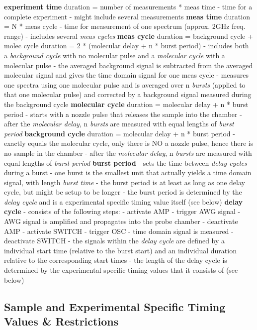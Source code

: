 \textbf{experiment time} duration = number of measurements * meas time -
time for a complete experiment - might include several measurements
\textbf{meas time} duration = N * meas cycle - time for measurement of
one spectrum (approx. 2GHz freq. range) - includes several \emph{meas
cycles} \textbf{meas cycle} duration = background cycle + molec cycle
duration = 2 * (molecular delay + n * burst period) - includes both a
\emph{background cycle} with no molecular pulse and a \emph{molecular
cycle} with a molecular pulse - the averaged background signal is
subtracted from the averaged molecular signal and gives the time domain
signal for one meas cycle - measures one spectra using one molecular
pulse and is averaged over n \emph{bursts} (applied to that one
molecular pulse) and corrected by a background signal measured during
the background cycle \textbf{molecular cycle} duration = molecular delay
+ n * burst period - starts with a nozzle pulse that releases the sample
into the chamber - after the \emph{molecular delay}, n \emph{bursts} are
measured with equal lengths of \emph{burst period} \textbf{background
cycle} duration = molecular delay + n * burst period - exactly equals
the molecular cycle, only there is NO a nozzle pulse, hence there is no
sample in the chamber - after the \emph{molecular delay}, n
\emph{bursts} are measured with equal lengths of \emph{burst period}
\textbf{burst period} - sets the time between \emph{delay cycles} during
a burst - one burst is the smallest unit that actually yields a time
domain signal, with length \emph{burst time} - the burst period is at
least as long as one delay cycle, but might be setup to be longer - the
burst period is determined by the \emph{delay cycle} and is a
experimental specific timing value itself (see below) \textbf{delay
cycle} - consists of the following steps: - activate AMP - trigger AWG
signal - AWG signal is amplified and propagates into the probe chamber -
deactivate AMP - activate SWITCH - trigger OSC - time domain signal is
measured - deactivate SWITCH - the signals within the \emph{delay cycle}
are defined by a individual start time (relative to the burst start) and
an individual duration relative to the corresponding start times - the
length of the delay cycle is determined by the experimental specific
timing values that it consists of (see below)

\subsection{Sample and Experimental Specific Timing Values \&
Restrictions}

